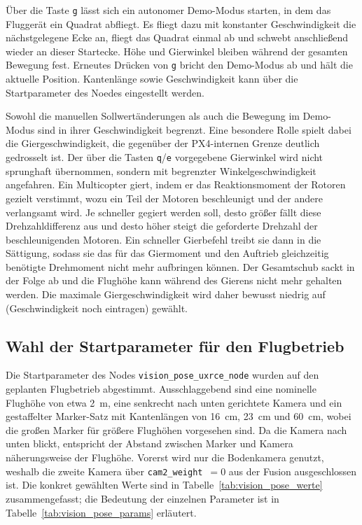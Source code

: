 Über die Taste \texttt{g} lässt sich ein autonomer Demo-Modus starten, in dem das Fluggerät ein Quadrat abfliegt.
Es fliegt dazu mit konstanter Geschwindigkeit die nächstgelegene Ecke an, fliegt das Quadrat einmal ab und schwebt anschließend wieder an dieser Startecke.
Höhe und Gierwinkel bleiben während der gesamten Bewegung fest.
Erneutes Drücken von \texttt{g} bricht den Demo-Modus ab und hält die aktuelle Position.
Kantenlänge sowie Geschwindigkeit kann über die Startparameter des Noedes eingestellt werden.

Sowohl die manuellen Sollwertänderungen als auch die Bewegung im Demo-Modus sind in ihrer Geschwindigkeit begrenzt.
Eine besondere Rolle spielt dabei die Giergeschwindigkeit, die gegenüber der PX4-internen Grenze deutlich gedrosselt ist.
Der über die Tasten \texttt{q}/\texttt{e} vorgegebene Gierwinkel wird nicht sprunghaft übernommen, sondern mit begrenzter Winkelgeschwindigkeit angefahren.
Ein Multicopter giert, indem er das Reaktionsmoment der Rotoren gezielt verstimmt, wozu ein Teil der Motoren beschleunigt und der andere verlangsamt wird.
Je schneller gegiert werden soll, desto größer fällt diese Drehzahldifferenz aus und desto höher steigt die geforderte Drehzahl der beschleunigenden Motoren.
Ein schneller Gierbefehl treibt sie dann in die Sättigung, sodass sie das für das Giermoment und den Auftrieb gleichzeitig benötigte Drehmoment nicht mehr aufbringen können.
Der Gesamtschub sackt in der Folge ab und die Flughöhe kann während des Gierens nicht mehr gehalten werden.
Die maximale Giergeschwindigkeit wird daher bewusst niedrig auf (Geschwindigkeit noch eintragen) gewählt.

\subsection{Wahl der Startparameter für den Flugbetrieb}
\label{subsec:pos_parametrierung}
Die Startparameter des Nodes \texttt{vision\_pose\_uxrce\_node} wurden auf den geplanten Flugbetrieb abgestimmt.
Ausschlaggebend sind eine nominelle Flughöhe von etwa 2~m, eine senkrecht nach unten gerichtete Kamera und ein gestaffelter Marker-Satz mit Kantenlängen von 16~cm, 23~cm und 60~cm, wobei die großen Marker für größere Flughöhen vorgesehen sind.
Da die Kamera nach unten blickt, entspricht der Abstand zwischen Marker und Kamera näherungsweise der Flughöhe.
Vorerst wird nur die Bodenkamera genutzt, weshalb die zweite Kamera über \texttt{cam2\_weight}~$=0$ aus der Fusion ausgeschlossen ist.
Die konkret gewählten Werte sind in Tabelle~\ref{tab:vision_pose_werte} zusammengefasst; die Bedeutung der einzelnen Parameter ist in Tabelle~\ref{tab:vision_pose_params} erläutert.

